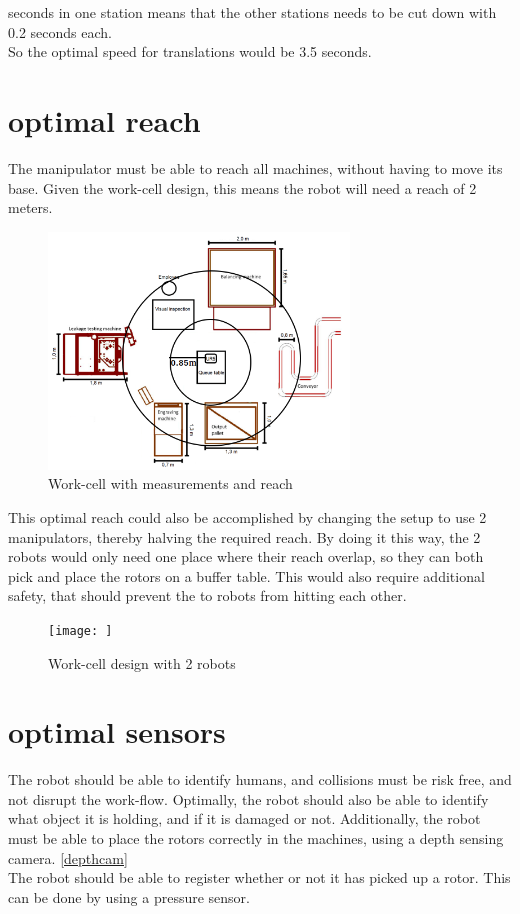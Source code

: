  seconds in one station means that the other stations needs to be cut down with 0.2 seconds each.\\
So the optimal speed for translations would be 3.5 seconds.\\

\section{optimal reach}

The manipulator must be able to reach all machines, without having to move its base. Given the work-cell design, this means the robot will need a reach of 2 meters. \\
\begin{figure}[h]
    \centering
    \includegraphics[width=8cm]{Design/Work_cell_3.png}
    \caption{Work-cell with measurements and reach}
    \label{fig:workcell}
\end{figure}

This optimal reach could also be accomplished by changing the setup to use 2 manipulators, thereby halving the required reach. By doing it this way, the 2 robots would only need one place where their reach overlap, so they can both pick and place the rotors on a buffer table. This would also require additional safety, that should prevent the to robots from hitting each other.\\

\begin{figure}[h]
    \centering
    \texttt{[image: ]}
    \caption{Work-cell design with 2 robots}
    \label{fig:workscell2arms}
\end{figure}

\section{optimal sensors}

The robot should be able to identify humans, and collisions must be risk free, and not disrupt the work-flow. Optimally, the robot should also be able to identify what object it is holding, and if it is damaged or not. Additionally, the robot must be able to place the rotors correctly in the machines, using a depth sensing camera. \ref{depthcam}\\
The robot should be able to register whether or not it has picked up a rotor. This can be done by using a pressure sensor.\\ 

